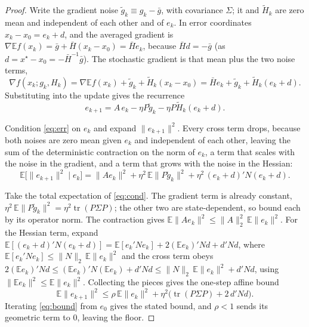 \documentclass[11pt]{article}
\newcommand{\Hbar}{\bar{H}}
\newcommand{\gbar}{\bar{g}}
\newcommand{\E}{\mathbb{E}}
\newcommand{\tr}{\operatorname{tr}}
\begin{document}
\begin{proof}
    Write the gradient noise $\tilde{g}_k\equiv g_k-\gbar$, with covariance
    $\Sigma$; it and $\tilde{H}_k$ are zero mean and independent of each other and of
    $e_k$. In error coordinates $x_k-x_0=e_k+d$, and the averaged gradient is
    $\nabla\E f(x_k)=\gbar+\Hbar(x_k-x_0)=\Hbar e_k$, because $\Hbar d=-\gbar$ (as
    $d=x^\star-x_0=-\Hbar^{-1}\gbar$). The stochastic gradient is that mean plus the
    two noise terms,
    \[
        \nabla f(x_k;g_k,H_k)=\nabla\E f(x_k)+\tilde{g}_k+\tilde{H}_k(x_k-x_0)
        =\Hbar e_k+\tilde{g}_k+\tilde{H}_k(e_k+d).
    \]
    Substituting into the update gives the recurrence
    \begin{equation}\label{eq:err}
        e_{k+1}=A\,e_k-\eta P\tilde{g}_k-\eta P\tilde{H}_k(e_k+d).
    \end{equation}

    Condition \eqref{eq:err} on $e_k$ and expand $\|e_{k+1}\|^2$. Every cross term
    drops, because both noises are zero mean given $e_k$ and independent of each
    other, leaving the sum of the deterministic contraction on the norm of $e_k$, a
    term that scales with the noise in the gradient, and a term that grows with the
    noise in the Hessian:
    \begin{equation}\label{eq:cond}
        \E\big[\|e_{k+1}\|^2\mid e_k\big]
        =\|A e_k\|^2+\eta^2\,\E\|P\tilde{g}_k\|^2+\eta^2\,(e_k+d)'N(e_k+d).
    \end{equation}

    Take the total expectation of \eqref{eq:cond}. The gradient term is already
    constant, $\eta^2\,\E\|P\tilde{g}_k\|^2=\eta^2\tr(P\Sigma P)$; the other two are
    state-dependent, so bound each by its operator norm. The contraction gives
    $\E\|Ae_k\|^2\le\|A\|_2^2\,\E\|e_k\|^2$. For the Hessian term, expand
    $\E[(e_k+d)'N(e_k+d)]=\E[e_k'Ne_k]+2(\E e_k)'Nd+d'Nd$, where
    $\E[e_k'Ne_k]\le\|N\|_2\,\E\|e_k\|^2$ and the cross term obeys
    $2(\E e_k)'Nd\le(\E e_k)'N(\E e_k)+d'Nd\le\|N\|_2\,\E\|e_k\|^2+d'Nd$, using
    $\|\E e_k\|^2\le\E\|e_k\|^2$. Collecting the pieces gives the one-step affine
    bound
    \begin{equation}\label{eq:bound}
        \E\|e_{k+1}\|^2\le\rho\,\E\|e_k\|^2+\eta^2\big(\tr(P\Sigma P)+2\,d'Nd\big).
    \end{equation}
    Iterating \eqref{eq:bound} from $e_0$ gives the stated bound, and $\rho<1$ sends
    its geometric term to $0$, leaving the floor.
\end{proof}
\end{document}
